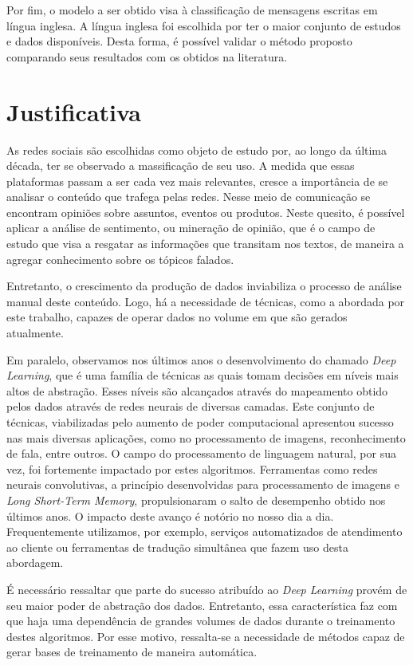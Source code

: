 Por fim, o modelo a ser obtido visa à classificação de mensagens escritas em língua inglesa.
A língua inglesa foi escolhida por ter o maior conjunto de estudos e dados disponíveis.
Desta forma, é possível validar o método proposto comparando seus resultados com os obtidos na literatura.

\section{Justificativa}

As redes sociais são escolhidas como objeto de estudo por, ao longo da última década, ter se observado a massificação
de seu uso.
A medida que essas plataformas passam a ser cada vez mais relevantes, cresce a importância de se analisar o conteúdo
que trafega pelas redes.
Nesse meio de comunicação se encontram opiniões sobre assuntos, eventos ou produtos.
Neste quesito, é possível aplicar a análise de sentimento, ou mineração de opinião, que é o campo de estudo que visa a
resgatar as informações que transitam nos textos, de maneira a agregar conhecimento sobre os tópicos falados.

Entretanto, o crescimento da produção de dados inviabiliza o processo de análise manual deste conteúdo.
Logo, há a necessidade de técnicas, como a abordada por este trabalho, capazes de operar dados no volume em que são
gerados atualmente.

Em paralelo, observamos nos últimos anos o desenvolvimento do chamado \textit{Deep Learning}, que é uma família de
técnicas as quais tomam decisões em níveis mais altos de abstração.
Esses níveis são alcançados através do mapeamento obtido pelos dados através de redes neurais de diversas camadas.
Este conjunto de técnicas, viabilizadas pelo aumento de poder computacional apresentou sucesso nas mais diversas
aplicações, como no processamento de imagens, reconhecimento de fala, entre outros.
O campo do processamento de linguagem natural, por sua vez, foi fortemente impactado por estes algoritmos.
Ferramentas como redes neurais convolutivas, a princípio desenvolvidas para processamento de imagens e
\textit{Long Short-Term Memory}, propulsionaram o salto de desempenho obtido nos últimos anos.
O impacto deste avanço é notório no nosso dia a dia.
Frequentemente utilizamos, por exemplo, serviços automatizados de atendimento ao cliente ou ferramentas de tradução
simultânea que fazem uso desta abordagem.

É necessário ressaltar que parte do sucesso atribuído ao \textit{Deep Learning} provém de seu maior poder de abstração
dos dados.
Entretanto, essa característica faz com que haja uma dependência de grandes volumes de dados durante o treinamento
destes algoritmos.
Por esse motivo, ressalta-se a necessidade de métodos capaz de gerar bases de treinamento de maneira automática.

